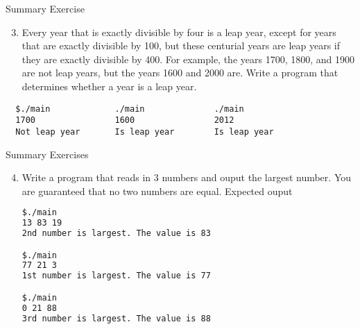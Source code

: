 \documentclass[10pt,xcolor={table,dvipsnames},t]{beamer}
\begin{document}
\begin{frame}[fragile]{Summary Exercise}
  \begin{enumerate}
    \setcounter{enumi}{2}
    \item Every year that is exactly divisible by four is a leap year, except for years that are exactly divisible by 100, but these centurial years are leap years if they are exactly divisible by 400. For example, the years 1700, 1800, and 1900 are not leap years, but the years 1600 and 2000 are. Write a program that determines whether a year is a leap year.
  \end{enumerate}
  \begin{lstlisting}
  $./main             ./main              ./main
  1700                1600                2012
  Not leap year       Is leap year        Is leap year
  \end{lstlisting}
\end{frame}

\begin{frame}[fragile]{Summary Exercises}
  \begin{enumerate}
    \setcounter{enumi}{3}
    \item Write a program that reads in 3 numbers and ouput the largest number. You are guaranteed that no two numbers are equal. Expected ouput
\begin{lstlisting}[language=bash]
$./main
13 83 19
2nd number is largest. The value is 83

$./main
77 21 3
1st number is largest. The value is 77

$./main
0 21 88
3rd number is largest. The value is 88
\end{lstlisting}
  \end{enumerate}
\end{frame}
\end{document}
